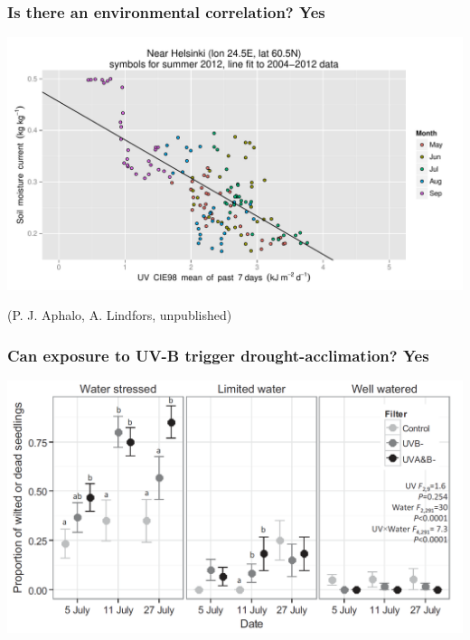 \documentclass[10pt]{beamer}\usepackage[]{graphicx}\usepackage[]{color}
\begin{document}
\begin{frame}
  \frametitle{Is there an environmental correlation? Yes}
  \includegraphics[width=\linewidth]{figures/soil-CIEmean.pdf}

  (P. J. Aphalo, A. Lindfors, unpublished)
\end{frame}

\begin{frame}
  \frametitle{Can exposure to UV-B trigger drought-acclimation? Yes}
  \includegraphics[width=\linewidth]{figures/birch-wilt.png}

  \autocite{Robson2014}
\end{frame}
\end{document}
